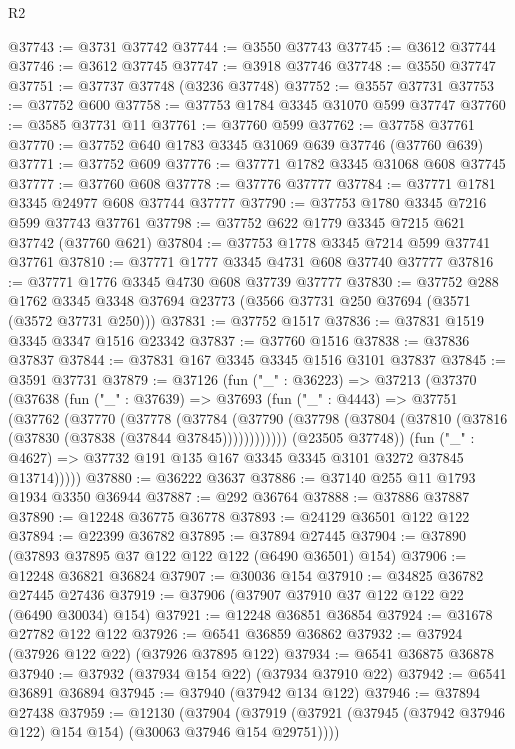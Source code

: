 \begin{lexlean}{R2}
\begin{coremodule}
@37743 := @3731 @37742
@37744 := @3550 @37743
@37745 := @3612 @37744
@37746 := @3612 @37745
@37747 := @3918 @37746
@37748 := @3550 @37747
@37751 := @37737 @37748 (@3236 @37748)
@37752 := @3557 @37731
@37753 := @37752 @600
@37758 := @37753 @1784 @3345 @31070 @599 @37747
@37760 := @3585 @37731 @11
@37761 := @37760 @599
@37762 := @37758 @37761
@37770 := @37752 @640 @1783 @3345 @31069 @639 @37746 (@37760 @639)
@37771 := @37752 @609
@37776 := @37771 @1782 @3345 @31068 @608 @37745
@37777 := @37760 @608
@37778 := @37776 @37777
@37784 := @37771 @1781 @3345 @24977 @608 @37744 @37777
@37790 := @37753 @1780 @3345 @7216 @599 @37743 @37761
@37798 := @37752 @622 @1779 @3345 @7215 @621 @37742 (@37760 @621)
@37804 := @37753 @1778 @3345 @7214 @599 @37741 @37761
@37810 := @37771 @1777 @3345 @4731 @608 @37740 @37777
@37816 := @37771 @1776 @3345 @4730 @608 @37739 @37777
@37830 := @37752
    @288
    @1762
    @3345
    @3348
    @37694
    @23773
    (@3566 @37731 @250 @37694 (@3571 (@3572 @37731 @250)))
@37831 := @37752 @1517
@37836 := @37831 @1519 @3345 @3347 @1516 @23342
@37837 := @37760 @1516
@37838 := @37836 @37837
@37844 := @37831 @167 @3345 @3345 @1516 @3101 @37837
@37845 := @3591 @37731
@37879 := @37126
    (fun ("_" : @36223) =>
    @37213
      (@37370
        (@37638
          (fun ("_" : @37639) =>
          @37693
            (fun ("_" : @4443) =>
            @37751
              (@37762
                (@37770
                  (@37778
                    (@37784
                      (@37790
                        (@37798 (@37804 (@37810 (@37816 (@37830 (@37838 (@37844 @37845))))))))))))
              (@23505 @37748))
            (fun ("_" : @4627) => @37732 @191 @135 @167 @3345 @3345 @3101 @3272 @37845 @13714)))))
@37880 := @36222 @3637
@37886 := @37140 @255 @11 @1793 @1934 @3350 @36944
@37887 := @292 @36764
@37888 := @37886 @37887
@37890 := @12248 @36775 @36778
@37893 := @24129 @36501 @122 @122
@37894 := @22399 @36782
@37895 := @37894 @27445
@37904 := @37890 (@37893 @37895 @37 @122 @122 @122 (@6490 @36501) @154)
@37906 := @12248 @36821 @36824
@37907 := @30036 @154
@37910 := @34825 @36782 @27445 @27436
@37919 := @37906 (@37907 @37910 @37 @122 @122 @22 (@6490 @30034) @154)
@37921 := @12248 @36851 @36854
@37924 := @31678 @27782 @122 @122
@37926 := @6541 @36859 @36862
@37932 := @37924 (@37926 @122 @22) (@37926 @37895 @122)
@37934 := @6541 @36875 @36878
@37940 := @37932 (@37934 @154 @22) (@37934 @37910 @22)
@37942 := @6541 @36891 @36894
@37945 := @37940 (@37942 @134 @122)
@37946 := @37894 @27438
@37959 := @12130
    (@37904 (@37919 (@37921 (@37945 (@37942 @37946 @122) @154 @154) (@30063 @37946 @154 @29751))))

\end{coremodule}
\end{lexlean}
